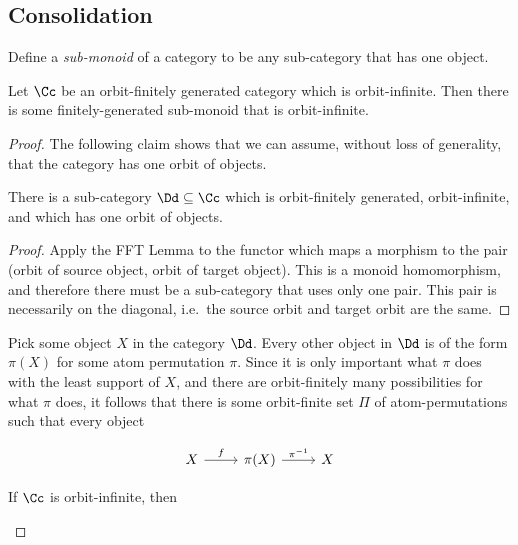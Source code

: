 

\subsection{Consolidation}
\label{sec:consolidation}



Define a \emph{sub-monoid} of a category to be any sub-category that has one object.

\begin{lemma}
    \label{lem:consolidation-lemma} Let $\Cc$ be an orbit-finitely generated category which is orbit-infinite. Then there is some finitely-generated sub-monoid that is orbit-infinite.
\end{lemma}
\begin{proof}
     The following claim shows that we can assume, without loss of generality, that the category has one orbit of objects.
    
    \begin{claim}  There  is a sub-category $\Dd \subseteq \Cc$ which is orbit-finitely generated, orbit-infinite, and which has one orbit of objects.
    \end{claim}
    \begin{proof}
    Apply the FFT Lemma to the functor which maps a morphism to the pair (orbit of source object, orbit of target object). This is a monoid homomorphism, and therefore there must be a sub-category that uses only one pair. This pair is necessarily on the diagonal, i.e.~the source orbit and target orbit are the same.
    \end{proof}

    Pick some object $X$ in the category $\Dd$. Every other object in $\Dd$ is of the form $\pi(X)$ for some atom permutation $\pi$. Since it is only important what $\pi$ does with the least support of $X$, and there are orbit-finitely many possibilities for what $\pi$ does, it follows that there is some orbit-finite set $\Pi$ of atom-permutations such that every object 

    \[
    \begin{tikzcd}
    X \ar[r,"f"] & 
    \pi(X) \ar[r,"\pi^{-1}"] 
 & X
    \end{tikzcd}
    \]
    \begin{claim}
        If $\Cc$ is orbit-infinite, then 
    \end{claim}
\end{proof}


\begin{definition}
    \label{def:image-restriction}
\end{definition}

